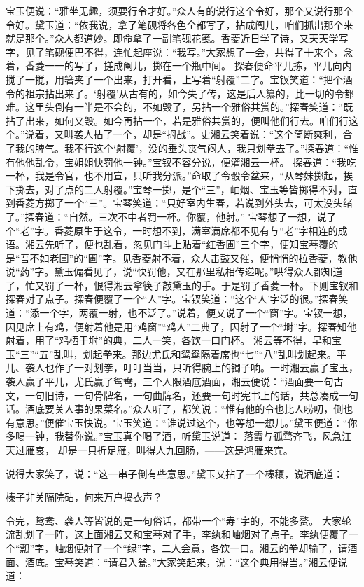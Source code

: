 \documentclass[12pt,oneside]{book}
\begin{document}
宝玉便说：“雅坐无趣，须要行令才好。”众人有的说行这个令好，那个又说行那个令好。黛玉道：“依我说，拿了笔砚将各色全都写了，拈成阄儿，咱们抓出那个来就是那个。”众人都道妙。即命拿了一副笔砚花笺。香菱近日学了诗，又天天学写字，见了笔砚便巴不得，连忙起座说：“我写。”大家想了一会，共得了十来个，念着，香菱一一的写了，搓成阄儿，掷在一个瓶中间。
探春便命平儿拣，平儿向内搅了一搅，用箸夹了一个出来，打开看，上写着“射覆”二字。宝钗笑道：“把个酒令的祖宗拈出来了。‘射覆’从古有的，如今失了传，这是后人纂的，比一切的令都难。这里头倒有一半是不会的，不如毁了，另拈一个雅俗共赏的。”探春笑道：“既拈了出来，如何又毁。如今再拈一个，若是雅俗共赏的，便叫他们行去。咱们行这个。”说着，又叫袭人拈了一个，却是“拇战”。史湘云笑着说：“这个简断爽利，合了我的脾气。我不行这个‘射覆’，没的垂头丧气闷人，我只划拳去了。”探春道：“惟有他他乱令，宝姐姐快罚他一钟。”宝钗不容分说，便灌湘云一杯。
探春道：“我吃一杯，我是令官，也不用宣，只听我分派。”命取了令骰令盆来，“从琴妹掷起，挨下掷去，对了点的二人射覆。”宝琴一掷，是个“三”，岫烟、宝玉等皆掷得不对，直到香菱方掷了一个“三”。宝琴笑道：“只好室内生春，若说到外头去，可太没头绪了。”探春道：“自然。三次不中者罚一杯。你覆，他射。”
宝琴想了一想，说了个“老”字。香菱原生于这令，一时想不到，满室满席都不见有与“老”字相连的成语。湘云先听了，便也乱看，忽见门斗上贴着“红香圃”三个字，便知宝琴覆的是“吾不如老圃”的“圃”字。见香菱射不着，众人击鼓又催，便悄悄的拉香菱，教他说“药”字。黛玉偏看见了，说“快罚他，又在那里私相传递呢。”哄得众人都知道了，忙又罚了一杯，恨得湘云拿筷子敲黛玉的手。于是罚了香菱一杯。下则宝钗和探春对了点子。探春便覆了一个“人”字。宝钗笑道：“这个‘人’字泛的很。”探春笑道：“添一个字，两覆一射，也不泛了。”说着，便又说了一个“窗”字。宝钗一想，因见席上有鸡，便射着他是用“鸡窗”“鸡人”二典了，因射了一个“埘”字。探春知他射着，用了“鸡栖于埘”的典，二人一笑，各饮一口门杯。
湘云等不得，早和宝玉“三”“五”乱叫，划起拳来。那边尤氏和鸳鸯隔着席也“七”“八”乱叫划起来。平儿、袭人也作了一对划拳，叮叮当当，只听得腕上的镯子响。一时湘云赢了宝玉，袭人赢了平儿，尤氏赢了鸳鸯，三个人限酒底酒面，湘云便说：“酒面要一句古文，一句旧诗，一句骨牌名，一句曲牌名，还要一句时宪书上的话，共总凑成一句话。酒底要关人事的果菜名。”众人听了，都笑说：“惟有他的令也比人唠叨，倒也有意思。”便催宝玉快说。宝玉笑道：“谁说过这个，也等想一想儿。”黛玉便道：“你多喝一钟，我替你说。”宝玉真个喝了酒，听黛玉说道：
落霞与孤骛齐飞，风急江天过雁哀，
却是一只折足雁，叫得人九回肠，——这是鸿雁来宾。

说得大家笑了，说：“这一串子倒有些意思。”黛玉又拈了一个榛穰，说酒底道：

榛子非关隔院砧，何来万户捣衣声？

令完，鸳鸯、袭人等皆说的是一句俗话，都带一个“寿”字的，不能多赘。
大家轮流乱划了一阵，这上面湘云又和宝琴对了手，李纨和岫烟对了点子。李纨便覆了一个“瓢”字，岫烟便射了一个“绿”字，二人会意，各饮一口。湘云的拳却输了，请酒面、酒底。宝琴笑道：“请君入瓮。”大家笑起来，说：“这个典用得当。”湘云便说道：
\end{document}
